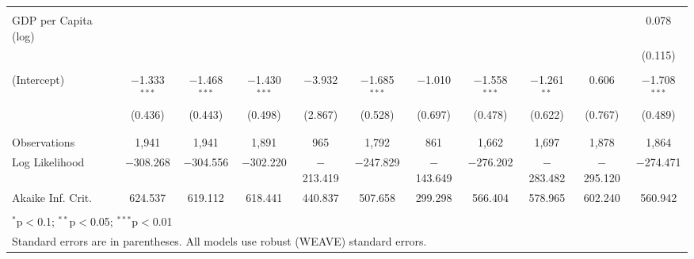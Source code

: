 \documentclass[a4paper]{article}\usepackage[]{graphicx}\usepackage[]{color}
\begin{document}
\begin{table}
\begin{center}
{{\begin{tabular}{@{\extracolsep{5pt}}lcccccccccc}
  & & & & & & & & & & \\ 
 GDP per Capita (log) &  &  &  &  &  &  &  &  &  & 0.078 \\ 
  &  &  &  &  &  &  &  &  &  & (0.115) \\ 
  & & & & & & & & & & \\ 
 (Intercept) & $-$1.333$^{***}$ & $-$1.468$^{***}$ & $-$1.430$^{***}$ & $-$3.932 & $-$1.685$^{***}$ & $-$1.010 & $-$1.558$^{***}$ & $-$1.261$^{**}$ & 0.606 & $-$1.708$^{***}$ \\ 
  & (0.436) & (0.443) & (0.498) & (2.867) & (0.528) & (0.697) & (0.478) & (0.622) & (0.767) & (0.489) \\ 
  & & & & & & & & & & \\ 
\hline \\[-1.8ex] 
Observations & 1,941 & 1,941 & 1,891 & 965 & 1,792 & 861 & 1,662 & 1,697 & 1,878 & 1,864 \\ 
Log Likelihood & $-$308.268 & $-$304.556 & $-$302.220 & $-$213.419 & $-$247.829 & $-$143.649 & $-$276.202 & $-$283.482 & $-$295.120 & $-$274.471 \\ 
Akaike Inf. Crit. & 624.537 & 619.112 & 618.441 & 440.837 & 507.658 & 299.298 & 566.404 & 578.965 & 602.240 & 560.942 \\ 
\hline 
\hline \\[-1.8ex] 
\multicolumn{11}{l}{$^{*}$p$<$0.1; $^{**}$p$<$0.05; $^{***}$p$<$0.01} \\ 
\multicolumn{11}{l}{Standard errors are in parentheses. All models use robust (WEAVE) standard errors.} \\ 
\end{tabular} 

}}
\end{center}

\end{table}
\end{document}
